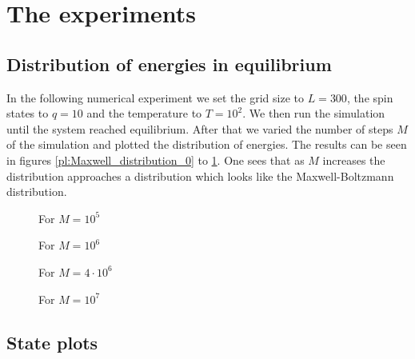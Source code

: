 \section{The experiments}

\subsection{Distribution of energies in equilibrium}

In the following numerical experiment we set the grid size to $L=300$, the spin states to $q=10$ and the temperature to $T=10^2$. We then run the simulation until the system reached equilibrium. After that we varied the number of steps $M$ of the simulation and plotted the distribution of energies. The results can be seen in figures \ref{pl:Maxwell_distribution_0} to \ref{pl:Maxwell_distribution_3}. One sees that as $M$ increases the distribution approaches a distribution which looks like the Maxwell-Boltzmann distribution.

\begin{figure}
\begin{minipage}[b]{0.4\textwidth}
\centering

\vspace*{-0.5cm}
\caption{For $M=10^5$}
\label{pl:Maxwell_distribution_0}
\end{minipage}
\hfill
\begin{minipage}[b]{0.4\textwidth}
\centering

\vspace*{-0.5cm}
\caption{For $M=10^6$}
\label{pl:Maxwell_distribution_1}
\end{minipage}
\begin{minipage}[b]{0.4\textwidth}
\vspace*{1cm}
\centering

\vspace*{-0.5cm}
\caption{For $M=4\cdot10^6$}
\label{pl:Maxwell_distribution_2}
\end{minipage}
\hfill
\begin{minipage}[b]{0.4\textwidth}
\centering

\vspace*{-0.5cm}
\caption{For $M=10^7$}
\label{pl:Maxwell_distribution_3}
\end{minipage}
\end{figure}

\subsection{State plots}

